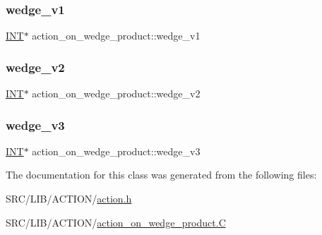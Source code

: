 \subsubsection{\texorpdfstring{wedge\+\_\+v1}{wedge\_v1}}
{\footnotesize\ttfamily \mbox{\hyperlink{galois_8h_a09fddde158a3a20bd2dcadb609de11dc}{I\+NT}}$\ast$ action\+\_\+on\+\_\+wedge\+\_\+product\+::wedge\+\_\+v1}

\mbox{\label{classaction__on__wedge__product_ad6b4b50a8af0ce039ee254d64c4a7477}} 
\subsubsection{\texorpdfstring{wedge\+\_\+v2}{wedge\_v2}}
{\footnotesize\ttfamily \mbox{\hyperlink{galois_8h_a09fddde158a3a20bd2dcadb609de11dc}{I\+NT}}$\ast$ action\+\_\+on\+\_\+wedge\+\_\+product\+::wedge\+\_\+v2}

\mbox{\label{classaction__on__wedge__product_a8f222f9cb122d8ed3b72d08d9da87c5a}} 
\subsubsection{\texorpdfstring{wedge\+\_\+v3}{wedge\_v3}}
{\footnotesize\ttfamily \mbox{\hyperlink{galois_8h_a09fddde158a3a20bd2dcadb609de11dc}{I\+NT}}$\ast$ action\+\_\+on\+\_\+wedge\+\_\+product\+::wedge\+\_\+v3}



The documentation for this class was generated from the following files\+:\begin{DoxyCompactItemize}
\item 
S\+R\+C/\+L\+I\+B/\+A\+C\+T\+I\+O\+N/\mbox{\hyperlink{action_8h}{action.\+h}}\item 
S\+R\+C/\+L\+I\+B/\+A\+C\+T\+I\+O\+N/\mbox{\hyperlink{action__on__wedge__product_8_c}{action\+\_\+on\+\_\+wedge\+\_\+product.\+C}}\end{DoxyCompactItemize}
